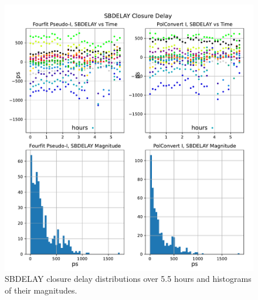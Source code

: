 \documentclass[letterpaper,twoside,12pt]{article}
\begin{document}
\begin{figure}[ht!]
  \begin{center}
  \includegraphics[width=35pc]{SBDELAY_Closure_Delay.pdf}
  \caption{\small SBDELAY closure delay distributions over 5.5 hours and histograms of their magnitudes.}
  \label{sbd}
  \end{center}
\end{figure}
\end{document}
